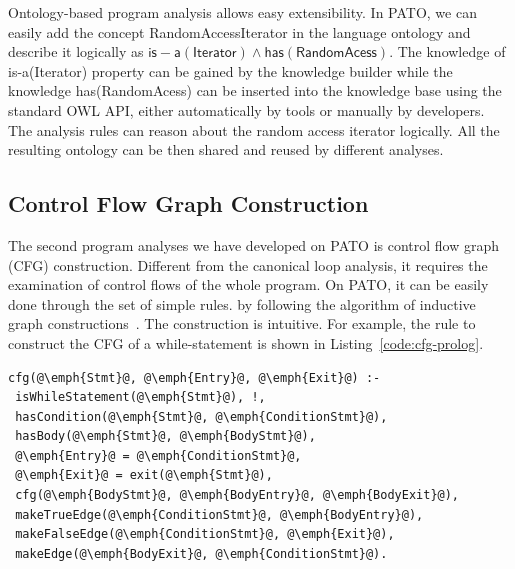 Ontology-based program analysis allows easy extensibility. 
In PATO, we can easily add the concept \textsf{RandomAccessIterator} in the language ontology and describe it logically as $\mathsf{is-a(Iterator)}\wedge\mathsf{has(RandomAcess)}$. 
The knowledge of \textsf{is-a(Iterator)} property can be gained by the knowledge builder while the knowledge \textsf{has(RandomAcess)} can be inserted into the knowledge base using the standard OWL API, either automatically by tools or manually by developers. 
The analysis rules can reason about the random access iterator logically. 
All the resulting ontology can be then shared and reused by different analyses.

\subsection{Control Flow Graph Construction}

The second program analyses we have developed on PATO is control flow
graph (CFG) construction. Different from the canonical loop analysis,
it requires the examination of control flows of the whole program.  On
PATO, it can be easily done through the set of simple rules.  by
following the algorithm of inductive graph
constructions~\cite{fischer_crafting_2009}.  The construction is
intuitive. For example, the rule to construct the CFG of a
\textsf{while}-statement is shown in Listing~\ref{code:cfg-prolog}.
\begin{lstlisting}[xleftmargin=.1\columnwidth,
xrightmargin=.1\columnwidth, escapechar=@, 
caption= Rule to construct CFG for a While statement, label=code:cfg-prolog]
cfg(@\emph{Stmt}@, @\emph{Entry}@, @\emph{Exit}@) :-
 isWhileStatement(@\emph{Stmt}@), !,
 hasCondition(@\emph{Stmt}@, @\emph{ConditionStmt}@),
 hasBody(@\emph{Stmt}@, @\emph{BodyStmt}@),
 @\emph{Entry}@ = @\emph{ConditionStmt}@,
 @\emph{Exit}@ = exit(@\emph{Stmt}@),
 cfg(@\emph{BodyStmt}@, @\emph{BodyEntry}@, @\emph{BodyExit}@),
 makeTrueEdge(@\emph{ConditionStmt}@, @\emph{BodyEntry}@),
 makeFalseEdge(@\emph{ConditionStmt}@, @\emph{Exit}@),
 makeEdge(@\emph{BodyExit}@, @\emph{ConditionStmt}@).
\end{lstlisting}

